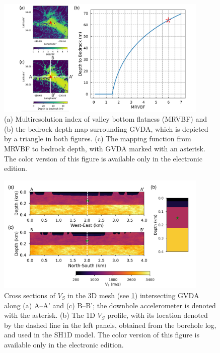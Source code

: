 \clearpage
\begin{figure}[!ht]
  \centering
  \includegraphics[width=0.9\textwidth]{figures/figure_etf_2.pdf}
  \caption{(a) Multiresolution index of valley bottom flatness (MRVBF) and (b) the bedrock depth map surrounding GVDA, which is depicted by a triangle in both figures. (c) The mapping function from MRVBF to bedrock depth, with GVDA marked with an asterisk. The color version of this figure is available only in the electronic edition.}
  \label{fig:etf-2}
\end{figure}

\clearpage
\begin{figure}[!ht]
  \centering
  \includegraphics[width=0.9\textwidth]{figures/figure_etf_3.pdf}
  \caption{Cross sections of $V_S$ in the 3D mesh (see \cref{fig:etf-2}) intersecting GVDA along (a) A–A' and (c) B–B'; the downhole accelerometer is denoted with the asterisk. (b) The 1D $V_S$ profile, with its location denoted by the dashed line in the left panels, obtained from the borehole log, and used in the SH1D model. The color version of this figure is available only in the electronic edition.}
  \label{fig:etf-3}
\end{figure}

